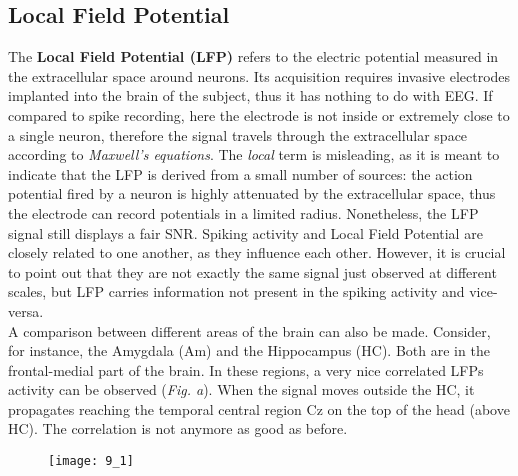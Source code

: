 \subsection{Local Field Potential}
The \textbf{Local Field Potential (LFP)} refers to the electric potential measured in the
extracellular space around neurons. Its acquisition requires invasive electrodes
implanted into the brain of the subject, thus it has nothing to do with EEG. If compared to
spike recording, here the electrode is not inside or extremely close to a single neuron,
therefore the signal travels through the extracellular space according to \textit{Maxwell's
equations}. The \textit{local} term is misleading, as it is meant to indicate that
the LFP is derived from a small number of sources: the action potential fired by a
neuron is highly attenuated by the extracellular space, thus the electrode can record
potentials in a limited radius. Nonetheless, the LFP signal still displays a fair
SNR. Spiking activity and Local Field Potential are closely
related to one another, as they influence each other. However, it is crucial to point
out that they are not exactly the same signal just observed at different scales, but
LFP carries information not present in the spiking activity and vice-versa.\\

A comparison between different areas of the brain can also be made. Consider, for instance, 
the Amygdala (Am) and the Hippocampus (HC). Both are in the frontal-medial part of the brain.
In these regions, a very nice correlated LFPs activity can be observed (\textit{Fig. a}). When 
the signal moves outside the HC, it propagates reaching the temporal central region Cz on the top 
of the head (above HC). The correlation is not anymore as good as before.
\begin{figure}[H]
    \texttt{[image: 9\_1]}
    \centering
\end{figure}

